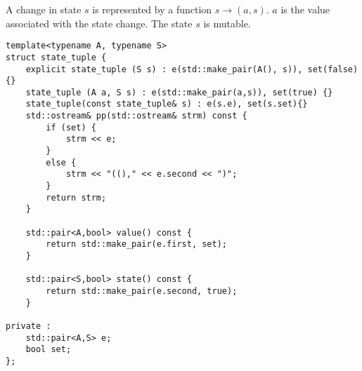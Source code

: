 \documentclass[12pt,fleqn]{article}
\begin{document}
A change in state $s$ is represented by a function $s \rightarrow (a,s)$. 
$a$ is the value associated with the state change.
The state $s$ is mutable.

\begin{lstlisting}[caption=state tuple, label=state_tuple]
template<typename A, typename S>
struct state_tuple {
	explicit state_tuple (S s) : e(std::make_pair(A(), s)), set(false){}
	state_tuple (A a, S s) : e(std::make_pair(a,s)), set(true) {}
	state_tuple(const state_tuple& s) : e(s.e), set(s.set){}
	std::ostream& pp(std::ostream& strm) const {
		if (set) {
			strm << e;
		}
		else {
			strm << "(()," << e.second << ")";
		}
		return strm;
	}

	std::pair<A,bool> value() const {
		return std::make_pair(e.first, set);
	}

	std::pair<S,bool> state() const {
		return std::make_pair(e.second, true);
	}

private :	
	std::pair<A,S> e;
	bool set;
};
\end{lstlisting}
\end{document}
